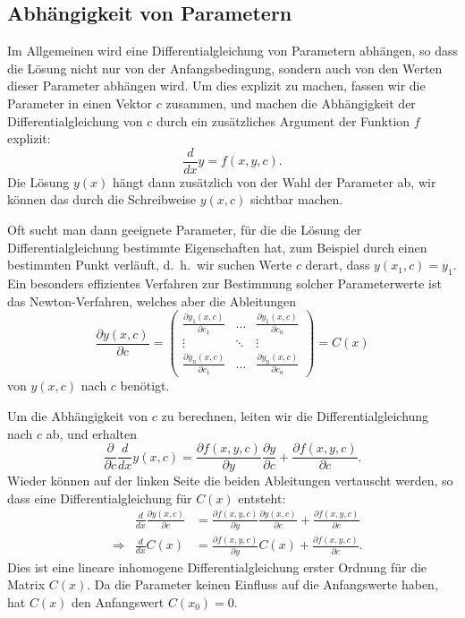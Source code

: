 \subsection{Abhängigkeit von Parametern}
%
Im Allgemeinen wird eine Differentialgleichung von Parametern abhängen,
so dass die Lösung nicht nur von der Anfangsbedingung, sondern auch von den
Werten dieser Parameter abhängen wird.
Um dies explizit zu machen, fassen wir die Parameter in einen Vektor $c$
zusammen, und machen die Abhängigkeit der Differentialgleichung
von $c$ durch ein zusätzliches Argument der Funktion $f$ explizit:
\[
\frac{d}{dx}y = f(x,y,c).
\]
Die Lösung $y(x)$ hängt dann zusätzlich von der Wahl der Parameter
ab, wir können das durch die Schreibweise $y(x,c)$ sichtbar machen.

Oft sucht man dann geeignete Parameter, für die die Lösung der
Differentialgleichung bestimmte Eigenschaften hat, zum Beispiel durch
einen bestimmten Punkt verläuft, d.~h.~wir suchen Werte $c$ derart,
dass $y(x_1,c)=y_1$.
Ein besonders effizientes Verfahren zur Bestimmung solcher Parameterwerte
ist das Newton-Verfahren, welches aber die Ableitungen
%
\[
\frac{\partial y(x,c)}{\partial c}
=
\begin{pmatrix}
\displaystyle \frac{\partial y_1(x,c)}{\partial c_1}
	&\dots
		&\displaystyle \frac{\partial y_1(x,c)}{\partial c_n}\\
\vdots
	&\ddots
		&\vdots\\
\displaystyle \frac{\partial y_n(x,c)}{\partial c_1}
	&\dots
		&\displaystyle \frac{\partial y_n(x,c)}{\partial c_n}
\end{pmatrix}
=C(x)
\]
von $y(x,c)$ nach $c$ benötigt.

Um die Abhängigkeit von $c$ zu berechnen, leiten wir die
Differentialgleichung nach $c$ ab, und erhalten 
\[
\frac{\partial}{\partial c} \frac{d}{dx} y(x,c)
=
\frac{\partial f(x,y,c)}{\partial y}\frac{\partial y}{\partial c}
+
\frac{\partial f(x,y,c)}{\partial c}.
\]
Wieder können auf der linken Seite die beiden Ableitungen vertauscht
werden, so dass eine Differentialgleichung für $C(x)$ entsteht:
\begin{align*}
&&
\frac{d}{dx}\frac{\partial y(x,c)}{\partial c}
&=
\frac{\partial f(x,y,c)}{\partial y}\frac{\partial y(x,c)}{\partial c}
+
\frac{\partial f(x,y,c)}{\partial c}
\\
&\Rightarrow&
\frac{d}{dx}C(x)
&=
\frac{\partial f(x,y,c)}{\partial y}C(x)
+
\frac{\partial f(x,y,c)}{\partial c}.
\end{align*}
Dies ist eine lineare inhomogene Differentialgleichung erster Ordnung
für die Matrix $C(x)$.
Da die Parameter keinen Einfluss auf die Anfangswerte haben, hat $C(x)$ den
Anfangswert $C(x_0)=0$.

